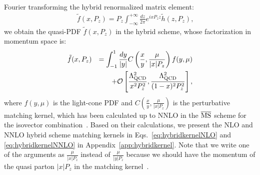 \documentclass[prd,aps,twocolumn,preprintnumbers, showpacs, nofootinbib,superscriptaddress,notitlepage]{revtex4-2}
\def\bea{\begin{eqnarray}}
\def\eea{\end{eqnarray}}
\begin{document}
Fourier transforming the hybrid renormalized matrix element:
\bea\label{eq:FT}
&&\tilde{f}(x, P_{z}) = P_z \int_{-\infty}^{+\infty} \frac{d z}{2 \pi} e^{i x P_z z} \tilde{h}(z, P_{z}),
\eea
we obtain the quasi-PDF $\tilde{f}(x, P_{z})$ in the hybrid scheme, 
whose factorization in momentum space is:
\bea\label{eq:matching}
\tilde{f}(x, P_{z}) 
&&= \int_{-1}^{1} \frac{dy}{\left| y \right|} C\left(\frac{x}{y},\frac{\mu}{|x|P_{z}}\right) f(y, \mu) \nonumber\\
&&+ {\cal O}\left[\frac{\Lambda_{\rm QCD}^2}{x^2 P_{z}^2}, \frac{\Lambda_{\rm QCD}^2}{(1-x)^2 P_{z}^2}\right],
\eea
where $f(y, \mu)$ is the light-cone PDF and $C\left(\frac{x}{y},\frac{\mu}{|x|P_{z}}\right)$ is the perturbative matching kernel, which has been calculated up to NNLO in the $\overline{\rm MS}$ scheme for the isovector combination~\cite{Li:2020xml,Chen:2020ody}. Based on their calculations, we present the NLO and NNLO hybrid scheme matching kernels in Eqs.~\eqref{eq:hybridkernelNLO} and \eqref{eq:hybridkernelNNLO} in Appendix~\ref{app:hybridkernel}. Note that we write one of the arguments as $\frac{\mu}{|x|P_{z}}$ instead of $\frac{\mu}{|y|P_{z}}$ because we should have the momentum of the quasi parton $|x| P_z$ in the matching kernel~\cite{Izubuchi:2018srq}. 
\end{document}
